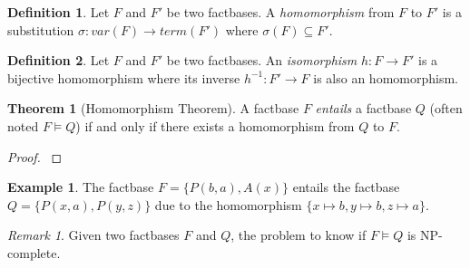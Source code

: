 \documentclass{article}
\theoremstyle{definition}
\newtheorem{definition}{Definition}[section]
\newtheorem{theorem}{Theorem}[section]
\newtheorem{example}{Example}[section]
\theoremstyle{remark}
\newtheorem{remark}{Remark}[section]
\begin{document}
\begin{definition}
Let $F$ and $F'$ be two factbases. A \emph{homomorphism} from $F$ to $F'$ is a substitution $\sigma:var(F) \to term(F')$ where $\sigma(F) \subseteq F'$.
\end{definition}

\begin{definition}
Let $F$ and $F'$ be two factbases. An \emph{isomorphism} $h:F \to F'$ is a bijective homomorphism where its inverse $h^{-1}:F' \to F$ is also an homomorphism. 
\end{definition}


\begin{theorem}[Homomorphism Theorem]
A factbase $F$ \emph{entails} a factbase $Q$ (often noted $F \models Q$) if and only if there exists a homomorphism from $Q$ to $F$.
\end{theorem}

\begin{proof}
\cite{base}
\end{proof}

\begin{example}
The factbase $F = \{P(b,a),A(x)\}$ entails the factbase $Q = \{P(x,a),P(y,z)\}$ due to the homomorphism $\{x \mapsto b, y \mapsto b, z \mapsto a \}$.
\end{example}

\begin{remark}
Given two factbases $F$ and $Q$, the problem to know if $F \models Q$ is NP-complete.
\end{remark}
\end{document}
